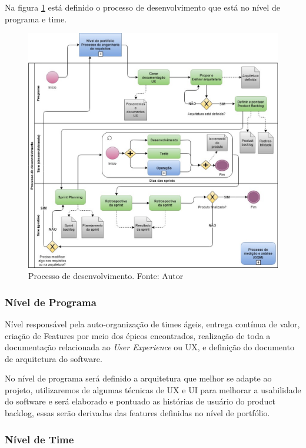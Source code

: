 Na figura \ref{fig:desenvolvimento} está definido o processo de desenvolvimento que está no nível de programa e time.

\begin{figure}[h!]
	\centering
  \includegraphics[keepaspectratio=true,scale=0.5]{figuras/desenvolvimento.eps}
  \caption[Processo de desenvolvimento.]{Processo de desenvolvimento. Fonte: Autor}
	\label{fig:desenvolvimento}
\end{figure}

\subsubsection{Nível de Programa}

Nível responsável pela auto-organização de times ágeis, entrega contínua de valor, criação de Features por meio dos épicos encontrados, realização de toda a documentação relacionada ao \textit{User Experience} ou UX, e definição do documento de arquitetura do software.


No nível de programa será definido a arquitetura que melhor se adapte ao projeto, utilizaremos de algumas técnicas de UX e UI para melhorar a usabilidade do software e será elaborado e pontuado as histórias de usuário do product backlog, essas serão derivadas das features definidas no nível de portfólio.

\subsubsection{Nível de Time}

